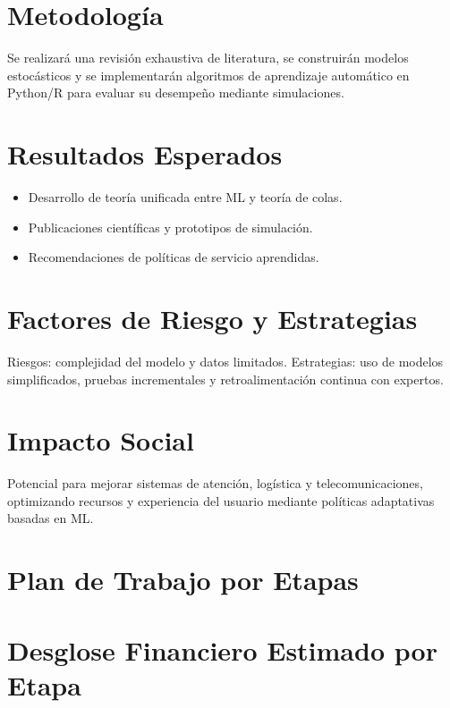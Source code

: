 \documentclass[12pt]{article}
\begin{document}
\section{Metodología}
Se realizará una revisión exhaustiva de literatura, se construirán modelos estocásticos y se implementarán algoritmos de aprendizaje automático en Python/R para evaluar su desempeño mediante simulaciones.

\section{Resultados Esperados}
\begin{itemize}
  \item Desarrollo de teoría unificada entre ML y teoría de colas.
  \item Publicaciones científicas y prototipos de simulación.
  \item Recomendaciones de políticas de servicio aprendidas.
\end{itemize}

\section{Factores de Riesgo y Estrategias}
Riesgos: complejidad del modelo y datos limitados. Estrategias: uso de modelos simplificados, pruebas incrementales y retroalimentación continua con expertos.

\section{Impacto Social}
Potencial para mejorar sistemas de atención, logística y telecomunicaciones, optimizando recursos y experiencia del usuario mediante políticas adaptativas basadas en ML.

\section{Plan de Trabajo por Etapas}

\section{Desglose Financiero Estimado por Etapa}
\end{document}

